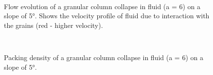 \begin{figure}
\ContinuedFloat
{}\\
\caption{Flow evolution of a granular column collapse in fluid (a = 6) on a 
slope of 5\si{\degree}. Shows the velocity profile of fluid due to interaction 
with the grains (red - higher 
velocity).}
\label{fig:a6_slope_snapshots}
\end{figure}



\begin{figure}
\\
\caption{Packing density of a granular column collapse in fluid (a = 6) on a 
slope of 5\si{\degree}.}
\label{fig:a6_slope_voro}
\end{figure}


